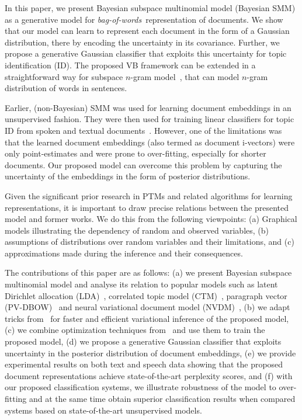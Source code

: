 \documentclass[journal]{IEEEtran}
\newcommand{\bow}{\textit{bag-of-words}}
\newcommand{\baysmm}{Bayesian SMM}
\begin{document}
In this paper, we present Bayesian subspace multinomial model (\baysmm) as a
generative model for \bow~representation of documents. We show that our model
can learn to represent each document in the form of a Gaussian 
distribution, there by encoding the uncertainty in its covariance. 
Further, we propose a generative Gaussian classifier that exploits this 
uncertainty for topic identification (ID). The proposed VB framework can be 
extended in a straightforward way for subspace \(n\)-gram 
model~\cite{Mehdi:2013:SnGM}, that can model \(n\)-gram distribution of words 
in sentences.

Earlier, (non-Bayesian) SMM was used for learning document embeddings in an
unsupervised fashion. They were then used for training linear classifiers for  
topic ID from spoken and textual 
documents~\cite{May:2015:mivec,Kesiraju:2016:SMM}.
However, one of the limitations was that the learned document embeddings
(also termed as document i-vectors) were only point-estimates and
were prone to over-fitting, especially for shorter documents.
Our proposed model can overcome this problem by capturing the uncertainty of
the embeddings in the form of posterior distributions.



Given the significant prior research in PTMs and related algorithms for 
learning representations, it is important to draw precise relations between the 
presented model and former works. We do this from the following viewpoints: (a) 
Graphical models illustrating the dependency of random and observed variables, 
(b) assumptions of distributions over random variables and their limitations, 
and (c) approximations made during the inference and their consequences.

The contributions of this paper are as follows: (a) we present Bayesian
subspace multinomial model and analyse its relation to popular models such
as latent Dirichlet allocation (LDA)~\cite{Blei:2003:LDA}, correlated topic
model (CTM)~\cite{Blei:2005:CTM}, paragraph vector 
(PV-DBOW)~\cite{Quoc:2014:PV} and neural variational document model 
(NVDM)~\cite{NVI:2016}, (b) we adapt tricks from~\cite{Kingma:2014:AEVB} for 
faster and efficient variational inference of the proposed model, (c) we 
combine optimization techniques from~\cite{Kingma:2014:Adam,Andrew:2007:L1} and 
use them to train the proposed model, (d) we propose a generative Gaussian 
classifier that exploits uncertainty in the posterior distribution of document 
embeddings, (e) we provide experimental results on both text and speech data 
showing that the proposed document representations achieve state-of-the-art 
perplexity scores, and (f) with our proposed classification systems, we 
illustrate robustness of the model to over-fitting and at the same time obtain 
superior classification results when compared systems based on state-of-the-art 
unsupervised models.
\end{document}

